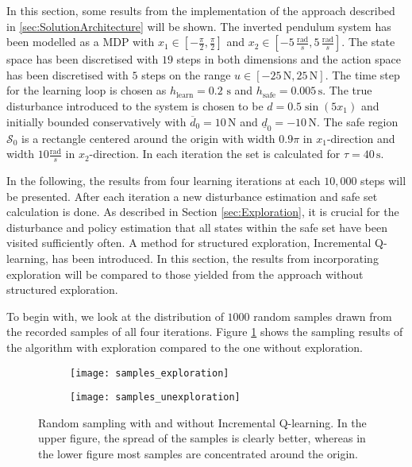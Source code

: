 \documentclass[../main.tex]{subfiles}
\begin{document}
In this section, some results from the implementation of the approach described in \ref{sec:SolutionArchitecture} will be shown. The inverted pendulum system has been modelled as a MDP with $x_1\in [-\frac{\pi}{2}, \frac{\pi}{2}] $ and $x_2 \in [-5\, \frac{\text{rad}}{s},5 \,\frac{\text{rad}}{s}] $. The state space has been discretised with $19$ steps in both dimensions and the action space has been discretised with $5$ steps on the range $u \in [-25\,\text{N},25\,\text{N}] $. The time step for the learning loop is chosen as $h_\text{learn} = 0.2\text{ s}$ and $h_\text{safe} = 0.005\,\text{s}$. The true disturbance introduced to the system is chosen to be $d = 0.5\sin(5x_1)$ and initially bounded conservatively with $\overline{d}_0 = 10 \,\text{N}$ and $\underline{d}_0 = -10 \,\text{N}$. The safe region $\mathcal{S}_0$ is a rectangle centered around the origin with width $0.9\pi$ in $x_1$-direction and width $10\frac{\text{rad}}{s}$ in $x_2$-direction. In each iteration the set is calculated for $\tau = 40\,\text{s}$.

In the following, the results from four learning iterations at each $10,000$ steps will be presented. After each iteration a new disturbance estimation and safe set calculation is done. As described in Section \ref{sec:Exploration}, it is crucial for the disturbance and policy estimation that all states within the safe set have been visited sufficiently often. A method for structured exploration, Incremental Q-learning, has been introduced. In this section, the results from incorporating exploration will be compared to those yielded from the approach without structured exploration. 

To begin with, we look at the distribution of $1000$ random samples drawn from the recorded samples of all four iterations. Figure \ref{fig:samples_exploration} shows the sampling results of the algorithm with exploration compared to the one without exploration. 

\begin{figure}
    \centering
    \begin{subfigure}[b]{\textwidth}
    \texttt{[image: samples\_exploration]}
    \end{subfigure}
    
    \begin{subfigure}[b]{\textwidth}
    \texttt{[image: samples\_unexploration]}
    \end{subfigure}
        \caption{Random sampling with and without Incremental Q-learning. In the upper figure, the spread of the samples is clearly better, whereas in the lower figure most samples are concentrated around the origin.}  \label{fig:samples_exploration}
\end{figure}
\end{document}
